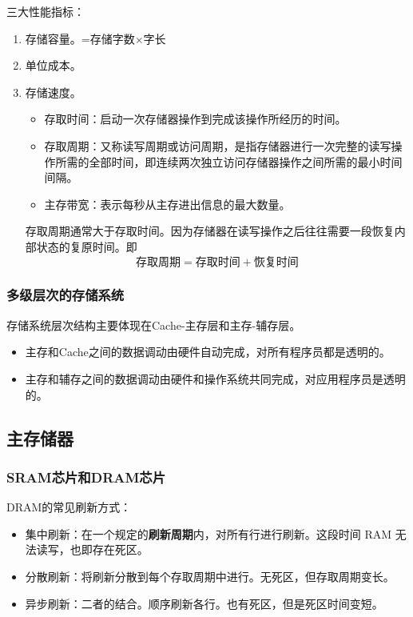 \documentclass[12pt, a4paper, oneside]{ctexart}
\begin{document}
三大性能指标：
\begin{enumerate}
  \item 存储容量。=存储字数$\times$字长
  \item 单位成本。
  \item 存储速度。
  \begin{itemize}
    \item 存取时间：启动一次存储器操作到完成该操作所经历的时间。
    \item 存取周期：又称读写周期或访问周期，是指存储器进行一次完整的读写操作所需的全部时间，即连续两次独立访问存储器操作之间所需的最小时间间隔。
    \item 主存带宽：表示每秒从主存进出信息的最大数量。
  \end{itemize}
  存取周期通常大于存取时间。因为存储器在读写操作之后往往需要一段恢复内部状态的复原时间。即
  \begin{equation*}
    \text{存取周期}=\text{存取时间}+\text{恢复时间}
  \end{equation*}
\end{enumerate}

\subsubsection{多级层次的存储系统}

存储系统层次结构主要体现在Cache-主存层和主存-辅存层。

\begin{itemize}
  \item 主存和Cache之间的数据调动由硬件自动完成，对所有程序员都是透明的。
  \item 主存和辅存之间的数据调动由硬件和操作系统共同完成，对应用程序员是透明的。
\end{itemize}

\subsection{主存储器}

\subsubsection{SRAM芯片和DRAM芯片}

DRAM的常见刷新方式：
\begin{itemize}
  \item 集中刷新：在一个规定的\textbf{刷新周期}内，对所有行进行刷新。这段时间 RAM 无法读写，也即存在死区。
  \item 分散刷新：将刷新分散到每个存取周期中进行。无死区，但存取周期变长。
  \item 异步刷新：二者的结合。顺序刷新各行。也有死区，但是死区时间变短。
\end{itemize}
\end{document}
